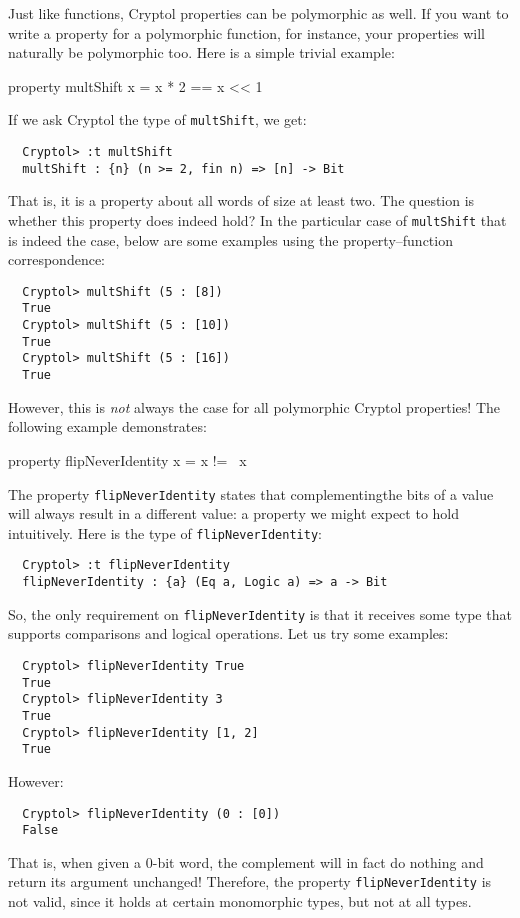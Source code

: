 Just like functions, Cryptol properties can be polymorphic as well. If
you want to write a property for a polymorphic function, for instance,
your properties will naturally be polymorphic too. Here is a simple
trivial example:
\begin{code}
  property multShift x = x * 2 == x << 1
\end{code}
If we ask Cryptol the type of {\tt multShift}, we get:
\begin{Verbatim}
  Cryptol> :t multShift
  multShift : {n} (n >= 2, fin n) => [n] -> Bit
\end{Verbatim}
That is, it is a property about all words of size at least two. The
question is whether this property does indeed hold? In the particular
case of {\tt multShift} that is indeed the case, below are some
examples using the property--function correspondence:\indThmFuncCorr
\begin{Verbatim}
  Cryptol> multShift (5 : [8])
  True
  Cryptol> multShift (5 : [10])
  True
  Cryptol> multShift (5 : [16])
  True
\end{Verbatim}
However, this is \emph{not} always the case for all polymorphic Cryptol
properties! The following example demonstrates:
\begin{code}
  property flipNeverIdentity x = x != ~x
\end{code}
The property {\tt flipNeverIdentity} states that
complementing\indComplement the bits of a value will always result in
a different value: a property we might expect to hold
intuitively. Here is the type of {\tt flipNeverIdentity}:
\begin{Verbatim}
  Cryptol> :t flipNeverIdentity
  flipNeverIdentity : {a} (Eq a, Logic a) => a -> Bit
\end{Verbatim}
So, the only requirement on \texttt{flipNeverIdentity} is that it
receives some type that supports comparisons and logical operations.
Let us try some examples:
\begin{Verbatim}
  Cryptol> flipNeverIdentity True
  True
  Cryptol> flipNeverIdentity 3
  True
  Cryptol> flipNeverIdentity [1, 2]
  True
\end{Verbatim}
However:
\begin{Verbatim}
  Cryptol> flipNeverIdentity (0 : [0])
  False
\end{Verbatim}
That is, when given a 0-bit word, the complement will in
fact do nothing and return its argument unchanged! Therefore, the
property {\tt flipNeverIdentity} is not valid, since it holds at
certain monomorphic types, but not at all types.\indMonomorphism

